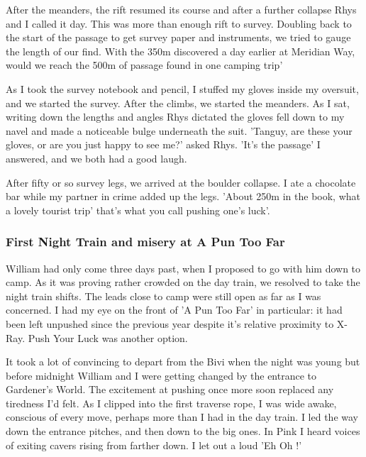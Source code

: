 \documentclass[onecolumn]{book}
\begin{document}
After the meanders, the rift resumed its course and after a further collapse Rhys and I called it day. This was more than enough rift to survey. Doubling back to the start of the passage to get survey paper and instruments, we tried to gauge the length of our find. With the 350m discovered a day earlier at Meridian Way, would we reach the 500m of passage found in one camping trip'

As I took the survey notebook and pencil, I stuffed my gloves inside my oversuit, and we started the survey. After the climbs, we started the meanders. As I sat, writing down the lengths and angles Rhys dictated the gloves fell down to my navel and made a noticeable bulge underneath the suit. 
'Tanguy, are these your gloves, or are you just happy to see me?' asked Rhys.
'It's the passage' I answered, and we both had a good laugh.

After fifty or so survey legs, we arrived at the boulder collapse. I ate a chocolate bar while my partner in crime added up the legs. 'About 250m in the book, what a lovely tourist trip' that's what you call pushing one's luck'. 

\subsubsection{First Night Train and misery at A Pun Too Far}

William had only come three days past, when I proposed to go with him down to camp. As it was proving rather crowded on the day train, we resolved to take the night train shifts. The leads close to camp were still open as far as I was concerned. I had my eye on the front of 'A Pun Too Far' in particular: it had been left unpushed since the previous year despite it's relative proximity to X-Ray. Push Your Luck was another option. 

It took a lot of convincing to depart from the Bivi when the night was young but before midnight William and I were getting changed by the entrance to Gardener's World. The excitement at pushing once more soon replaced any tiredness I'd felt. As I clipped into the first traverse rope, I was wide awake, conscious of every move, perhaps more than I had in the day train. I led the way down the entrance pitches, and then down to the big ones. In Pink I heard voices of exiting cavers rising from farther down. I let out a loud 'Eh Oh !'
\end{document}
